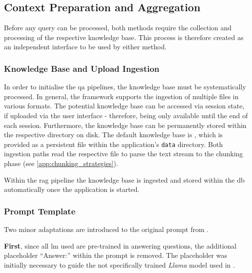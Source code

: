 %
\subsection{Context Preparation and Aggregation}\label{subsec:context_prep_common}

Before any query can be processed, both methods require the collection and processing of the respective knowledge base.
%
This process is therefore created as an independent interface to be used by either method.
%
\subsubsection{Knowledge Base and Upload Ingestion}\label{subsec:knowledge_base_upload}

In order to initialise the \ac{qa} pipelines, the knowledge base must be systematically processed.
In general, the framework supports the ingestion of multiple files in various formats.
The potential knowledge base can be accessed via session state, if uploaded via the user interface - therefore, being only available until the end of each session.
Furthermore, the knowledge base can be permanently stored within the respective directory on disk.
The default knowledge base is , which is provided as a persistent file within the application's \texttt{data} directory.
Both ingestion paths read the respective file to parse the text stream to the chunking phase (see \cref{app:chunking_strategies}).

Within the \ac{rag} pipeline the knowledge base is ingested and stored within the \ac{db} automatically once the application is started.
\subsubsection{Prompt Template}

Two minor adaptations are introduced to the original prompt from \citet{Paul_Keller}.

\textbf{First}, since all \ac{lm} used are pre-trained in answering questions, the additional placeholder \enquote{Answer:} within the prompt is removed.
The placeholder was initially necessary to guide the not specifically trained \textit{Llama} model used in \cite{Paul_Keller}.

